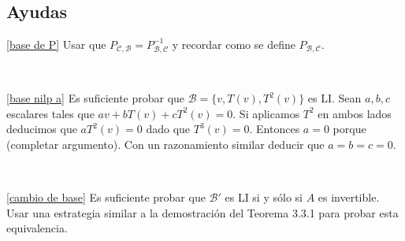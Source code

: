 \documentclass[12pt]{amsart}
\begin{document}
\

\subsection*{Ayudas}

\eqref{base de P} Usar que $P_{\mathcal{C},\mathcal{B}}=P_{\mathcal{B},\mathcal{C}}^{-1}$ y recordar como se define $P_{\mathcal{B},\mathcal{C}}$.

\

\eqref{base nilp a} Es suficiente probar que $\mathcal{B}=\{v, T(v), T^2(v)\}$ es LI. Sean $a,b,c$ escalares tales que $av+bT(v)+cT^2(v)=0$. Si aplicamos $T^2$ en ambos lados deducimos que $aT^2(v)=0$ dado que $T^3(v)=0$. Entonces $a=0$ porque (completar argumento). Con un razonamiento similar deducir que $a=b=c=0$.

\

\eqref{cambio de base} Es suficiente probar que $\mathcal{B}'$ es LI si y s\'olo si $A$ es invertible. Usar una estrategia similar a la demostraci\'on del Teorema 3.3.1 para probar esta equivalencia.
\end{document}

